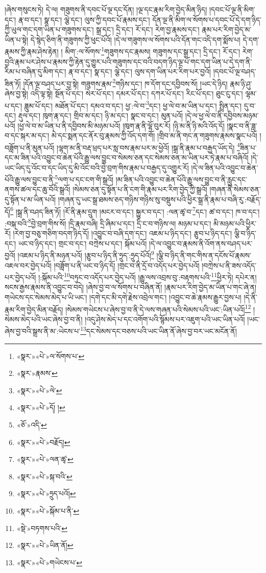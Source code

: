 །ཞེས་གསུངས་ཏེ། དེ་ལ། གཟུགས་ནི་དབང་པོ་ལྔ་དང་དོན། །ལྔ་དང་རྣམ་རིག་བྱེད་མིན་ཉིད། །དབང་པོ་ལྔ་ནི་མིག་དང་། རྣ་བ་དང་། སྣ་དང་། ལྕེ་དང་། ལུས་ཀྱི་དབང་པོ་རྣམས་དང་། དོན་ལྔ་ནི་མིག་ལ་སོགས་པ་དབང་པོ་དེ་དག་ཉིད་ཀྱི་ཡུལ་གང་དག་ཡིན་པ་གཟུགས་དང་། སྒྲ་དང་། དྲི་དང་། རོ་དང་། རེག་བྱ་རྣམས་དང་། རྣམ་པར་རིག་བྱེད་མ་ཡིན་པ་སྟེ། དེ་སྙེད་ཅིག་ནི་གཟུགས་ཀྱི་ཕུང་པོའོ། །དེ་ལ་གཟུགས་ལ་སོགས་པའི་དོན་གང་འདི་དག་སྨོས་པ། དེ་དག་རྣམས་ཀྱི་རྣམ་ཤེས་རྟེན། །
མིག་:ལ་སོགས་\footnote{«སྣར་»«པེ་»ལ་སོགས་པ་}གཟུགས་དང་རྣམས། གཟུགས་དང་སྒྲ་དང་། དྲི་དང་། རོ་དང་། རེག་བྱའི་རྣམ་པར་ཤེས་པ་རྣམས་ཀྱི་རྟེན་དུ་གྱུར་པའི་གཟུགས་དང་བའི་བདག་ཉིད་ལྔ་པོ་གང་དག་ཡིན་པ་དེ་དག་ནི་རིམ་པ་བཞིན་དུ་མིག་དང་། རྣ་བ་དང་། སྣ་དང་། ལྕེ་དང་། ལུས་དག་ཡིན་པར་རིག་པར་བྱའོ། །དབང་པོ་ལྔ་བཤད་ཟིན་ཏོ། །དོན་ལྔ་བཤད་པར་བྱ་སྟེ། གཟུགས་རྣམ་\footnote{«སྣར་»རྣམས་}གཉིས་དང་། ཁ་དོག་དང་དབྱིབས་སོ། །ཡང་དེ་ཉིད། རྣམ་ཉི་ཤུ་ཞེས་བྱ་སྟེ། འདི་ལྟ་སྟེ། སྔོན་པོ་དང་། སེར་པོ་དང་། དམར་པོ་དང་། དཀར་པོ་དང་། རིང་པོ་དང་། ཐུང་ངུ་དང་། ལྷམ་པ་དང་། ཟླུམ་པོ་དང་། མཐོན་པོ་དང་། དམའ་བ་དང་། ཕྱ་:ལེ་བ་\footnote{«སྣར་»«པེ་»ལེ་}དང་། ཕྱ་ལེ་བ་མ་ཡིན་པ་དང་། སྤྲིན་དང་། དུ་བ་དང་། རྡུལ་དང་། ཁུག་རྣ་དང་། གྲིབ་མ་དང་། ཉི་མ་དང་། སྣང་བ་དང་། མུན་པའོ། །དེ་ལ་ཕྱ་ལེ་བ་ནི་དབྱིབས་མཉམ་པའོ། །ཕྱ་ལེ་བ་མ་ཡིན་པ་ནི་དབྱིབས་མི་མཉམ་པའོ། །ཁུག་རྣ་ནི་ལྷོ་བུར་རོ། །ཉི་མ་ནི་ཉི་མའི་འོད་དོ། །སྣང་བ་ནི་ཟླ་བ་དང་སྐར་མ་དང་། མེ་དང་སྨན་དང་ནོར་བུ་རྣམས་ཀྱི་འོད་དག་གོ། །གྲིབ་མ་ནི་གང་ན་གཟུགས་རྣམས་སྣང་པའོ། །བཟློག་པ་ནི་མུན་པའོ། །ལྷག་མ་ནི་བརྡ་ཕྲད་པར་སླ་བས་རྣམ་པར་མ་ཕྱེའོ། །སྒྲ་ནི་རྣམ་པ་བརྒྱད་ཡོད་དེ། \footnote{«སྣར་»«པེ་»དོ། ། }ཟིན་པ་དང་མ་ཟིན་པའི་འབྱུང་བ་ཆེན་པོའི་རྒྱུ་ལས་བྱུང་བ་སེམས་ཅན་དང་སེམས་ཅན་མ་ཡིན་པར་ཏེ་རྣམ་པ་བཞིའོ། །དེ་ཡང་ཡིད་དུ་འོང་བ་དང་ཡིད་དུ་མི་འོང་བའི་བྱེ་བྲག་གིས་རྣམ་པ་བརྒྱད་དུ་འགྱུར་རོ། །དེ་ལ་ཟིན་པའི་འབྱུང་བ་ཆེན་པོའི་རྒྱུ་ལས་བྱུང་བ་ནི་\footnote{«ཅོ་»འདི་}ལག་པ་དང་ངག་གི་སྒྲའོ། །མ་ཟིན་པའི་འབྱུང་བ་ཆེན་པོའི་རྒྱུ་ལས་བྱུང་བ་ནི་རླུང་དང་ནགས་ཚལ་དང་ཆུ་བོའི་སྒྲའོ། །སེམས་ཅན་དུ་སྟོན་པ་ནི་ངག་གི་རྣམ་པར་རིག་བྱེད་ཀྱི་སྒྲའོ། །གཞན་ནི་སེམས་ཅན་དུ་སྟོན་པ་མ་ཡིན་པའོ། །གཞན་དུ་ཡང་སྒྲ་ཐམས་ཅད་གཉིས་གཉིས་སུ་བསྡུས་པའི་ཕྱིར་སྒྲ་ནི་རྣམ་པ་བཞི་རུ་:བརྗོད་དོ།\footnote{«སྣར་»«པེ་»བརྗོད།} །སྒྲ་ནི་བཤད་ཟིན་ཏོ། །རོ་ནི་རྣམ་དྲུག །མངར་བ་དང་། སྐྱུར་བ་དང་། :ལན་ཚྭ་བ་\footnote{«སྣར་»«པེ་»ལན་ཚྭ་}དང་། ཚ་བ་དང་། ཁ་བ་དང་། :བསྐ་བའི་\footnote{«སྣར་»«པེ་»སྐ་བའི་}བྱེ་བྲག་གིས་སོ། །དྲི་རྣམ་བཞི། དྲི་ཞིམ་པ་དང་། དྲི་ང་བ་གཉིས་ལ། མཉམ་པ་དང་། མི་མཉམ་པའི་ཕྱིར་རོ། །རེག་བྱ་བཅུ་གཅིག་བདག་ཉིད་དོ། །འབྱུང་བ་བཞི་དག་དང་། འཇམ་པ་ཉིད་དང་། རྩུབ་པ་ཉིད་དང་། ལྕི་བ་ཉིད་དང་། ཡང་བ་ཉིད་དང་། གྲང་བ་དང་། བཀྲེས་པ་དང་། སྐོམ་པའོ། །དེ་ལ་འབྱུང་བ་རྣམས་ནི་འོག་ནས་བཤད་པར་བྱའོ། །འཇམ་པ་ཉིད་ནི་མཉན་པའོ། །རྩུབ་པ་ཉིད་ནི་ཧྲུད་:ཧྲུད་པོའོ།\footnote{«སྣར་»«པེ་»ཧྲུད་པའོ།} །ལྕི་བ་ཉིད་ནི་གང་གིས་ན་དངོས་པོ་རྣམས་འཇལ་བར་བྱེད་པའོ། །བཟློག་པ་ནི་ཡང་བ་ཉིད་དོ། །གྲང་བ་ནི་དྲོ་བ་འདོད་པར་བྱེད་པའོ། །བཀྲེས་པ་ནི་ཟས་འདོད་པར་བྱེད་པའོ། །:སྐོམ་པའི་\footnote{«སྣར་»«པེ་»སྐོམ་པ་ནི་}བཏུང་བ་འདོད་པར་བྱེད་པའོ། །རྒྱུ་ལས་འབྲས་བུ་:བརྟགས་པའི་\footnote{«སྡེ་»བཏགས་པའི་}ཕྱིར་ཏེ། དཔེར་ན། སངས་རྒྱས་རྣམས་ནི་འབྱུང་བ་བདེ། །ཞེས་བྱ་བ་ལ་སོགས་པ་བཞིན་ནོ། །རྣམ་པར་རིག་བྱེད་མ་ཡིན་པ་གང་ཞེ་ན། གཡེངས་དང་སེམས་མེད་པ་ཡི་ཡང་། །དགེ་དང་མི་དགེ་རྗེས་འབྲེལ་གང་། །འབྱུང་བ་ཆེ་རྣམས་རྒྱུར་བྱས་པ། །དེ་ནི་རྣམ་རིག་བྱེད་མིན་བརྗོད། །སེམས་གཡེངས་པ་ཞེས་བྱ་བ་ནི་དེ་ལས་གཞན་པའི་སེམས་པའི་ཡང་:ཡིན་པའོ།\footnote{«སྣར་»«པེ་»ཡིན་ནོ།} །སེམས་མེད་པའི་ཡང་ཞེས་བྱ་བ་ནི། །འདུ་ཤེས་མེད་པ་དང་འགོག་པའི་སྙོམས་པར་འཇུག་པའི་ཡང་ཡིན་པའོ། །ཡང་ཞེས་བྱ་བའི་སྒྲས་ནི་མ་:ཡེངས་པ་\footnote{«སྣར་»«པེ་»གཡེངས་པ་}དང་སེམས་དང་བཅས་པའི་ཡང་ཡིན་ནོ་ཞེས་བྱ་བར་ཡང་མངོན་ནོ། 